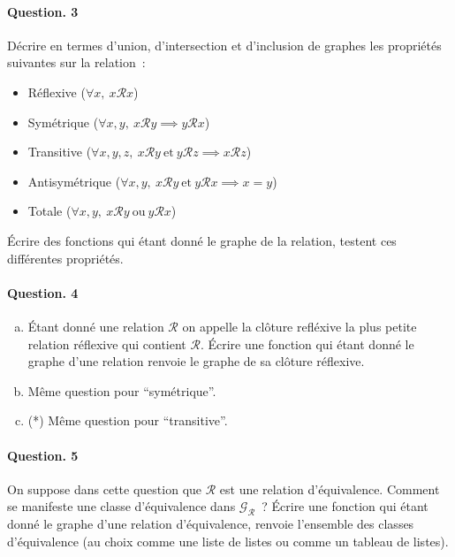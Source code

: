 \documentclass[10pt,a4paper]{article}
\begin{document}
\paragraph{Question. 3\\}
Décrire en termes d'union, d'intersection et d'inclusion de graphes les 
propriétés suivantes sur la relation~:
\begin{itemize}
\item Réflexive ($\forall x, \ x\mathcal{R}x$)
\item Symétrique ($\forall x,y, \ x\mathcal{R}y \implies y\mathcal{R}x$)
\item Transitive ($\forall x,y,z, \ x\mathcal{R}y \ \mathrm{et} \ y\mathcal{R}z \implies x\mathcal{R}z$)
\item Antisymétrique ($\forall x,y, \ x\mathcal{R}y \ \mathrm{et} \ y\mathcal{R}x \implies x=y$)
\item Totale ($\forall x,y, \ x\mathcal{R}y \ \mathrm{ou} \ y\mathcal{R}x$)
\end{itemize}  
Écrire des fonctions qui étant donné le graphe de la relation, testent ces 
différentes propriétés.

\paragraph{Question. 4\\}
\begin{enumerate}[a)]
\item Étant donné une relation $\mathcal{R}$ on appelle la clôture refléxive
la plus petite relation réflexive qui contient $\mathcal{R}$. Écrire une 
fonction qui étant donné le graphe d'une relation renvoie le graphe de sa 
clôture réflexive.
\item Même question pour ``symétrique''.
\item (*) Même question pour ``transitive''.
\end{enumerate}

\paragraph{Question. 5\\}
On suppose dans cette question que $\mathcal{R}$ est une relation d'équivalence.
Comment se manifeste une classe
d'équivalence dans $\mathcal{G}_{\mathcal{R}}$~? Écrire une fonction qui étant 
donné le graphe d'une relation d'équivalence, renvoie l'ensemble des classes 
d'équivalence (au choix comme une liste de listes ou comme un tableau de listes).
\end{document}
